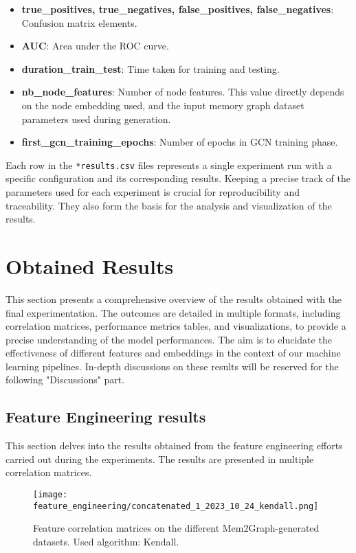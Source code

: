 \begin{itemize}
    \item \textbf{true\_positives, true\_negatives, false\_positives, false\_negatives}: Confusion matrix elements.
    \item \textbf{AUC}: Area under the ROC curve.
    \item \textbf{duration\_train\_test}: Time taken for training and testing.
    \item \textbf{nb\_node\_features}: Number of node features. This value directly depends on the node embedding used, and the input memory graph dataset parameters used during generation.
    \item \textbf{first\_gcn\_training\_epochs}: Number of epochs in GCN training phase.
\end{itemize}

Each row in the \texttt{*results.csv} files represents a single experiment run with a specific configuration and its corresponding results. Keeping a precise track of the parameters used for each experiment is crucial for reproducibility and traceability. They also form the basis for the analysis and visualization of the results.

\section{Obtained Results}

This section presents a comprehensive overview of the results obtained with the final experimentation. The outcomes are detailed in multiple formats, including correlation matrices, performance metrics tables, and visualizations, to provide a precise understanding of the model performances. The aim is to elucidate the effectiveness of different features and embeddings in the context of our machine learning pipelines. In-depth discussions on these results will be reserved for the following "Discussions" part.

\subsection{Feature Engineering results}

This section delves into the results obtained from the feature engineering efforts carried out during the experiments. The results are presented in multiple correlation matrices.

\begin{figure}[H]\label{results:corr_matrices:kendall}
    \centering
    \texttt{[image: feature\_engineering/concatenated\_1\_2023\_10\_24\_kendall.png]}
    \caption{Feature correlation matrices on the different Mem2Graph-generated datasets. Used algorithm: Kendall.}
\end{figure}

